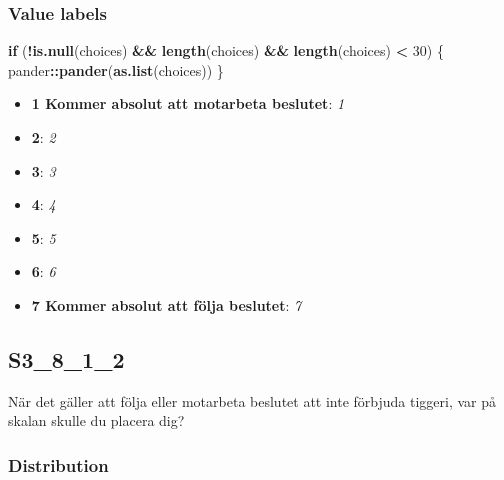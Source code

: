 \documentclass[]{book}
\newenvironment{Shaded}{\begin{snugshade}}{\end{snugshade}}
\newcommand{\KeywordTok}[1]{\textcolor[rgb]{0.13,0.29,0.53}{\textbf{#1}}}
\newcommand{\DecValTok}[1]{\textcolor[rgb]{0.00,0.00,0.81}{#1}}
\newcommand{\StringTok}[1]{\textcolor[rgb]{0.31,0.60,0.02}{#1}}
\newcommand{\ControlFlowTok}[1]{\textcolor[rgb]{0.13,0.29,0.53}{\textbf{#1}}}
\newcommand{\OperatorTok}[1]{\textcolor[rgb]{0.81,0.36,0.00}{\textbf{#1}}}
\newcommand{\NormalTok}[1]{#1}
\providecommand{\tightlist}{%
  \setlength{\itemsep}{0pt}\setlength{\parskip}{0pt}}
\begin{document}
\subsubsection{Value labels}\label{S3_8_1_1_labels}

\begin{Shaded}
\begin{Highlighting}[]
\ControlFlowTok{if}\NormalTok{ (}\OperatorTok{!}\KeywordTok{is.null}\NormalTok{(choices) }\OperatorTok{&&}\StringTok{ }\KeywordTok{length}\NormalTok{(choices) }\OperatorTok{&&}\StringTok{ }\KeywordTok{length}\NormalTok{(choices) }\OperatorTok{<}\StringTok{ }\DecValTok{30}\NormalTok{) \{}
\NormalTok{    pander}\OperatorTok{::}\KeywordTok{pander}\NormalTok{(}\KeywordTok{as.list}\NormalTok{(choices))}
\NormalTok{\}}
\end{Highlighting}
\end{Shaded}

\begin{itemize}
\tightlist
\item
  \textbf{1 Kommer absolut att motarbeta beslutet}: \emph{1}
\item
  \textbf{2}: \emph{2}
\item
  \textbf{3}: \emph{3}
\item
  \textbf{4}: \emph{4}
\item
  \textbf{5}: \emph{5}
\item
  \textbf{6}: \emph{6}
\item
  \textbf{7 Kommer absolut att följa beslutet}: \emph{7}
\end{itemize}

\subsection{S3\_8\_1\_2}\label{S3_8_1_2}

När det gäller att följa eller motarbeta beslutet att inte förbjuda
tiggeri, var på skalan skulle du placera dig?

\subsubsection{Distribution}\label{S3_8_1_2_distribution}
\end{document}
